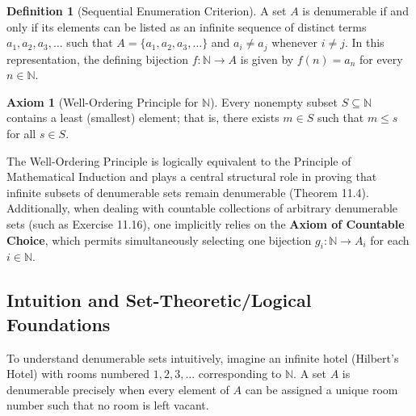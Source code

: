 \documentclass[11pt, letterpaper]{article}
\theoremstyle{definition}
\newtheorem{definition}{Definition}[section]
\newtheorem{axiom}{Axiom}[section]
\theoremstyle{remark}
\begin{document}
\begin{definition}[Sequential Enumeration Criterion]
A set $A$ is denumerable if and only if its elements can be listed as an infinite sequence of distinct terms $a_1, a_2, a_3, \dots$ such that $A = \{a_1, a_2, a_3, \dots\}$ and $a_i \neq a_j$ whenever $i \neq j$. In this representation, the defining bijection $f : \mathbb{N} \to A$ is given by $f(n) = a_n$ for every $n \in \mathbb{N}$.
\end{definition}

\begin{axiom}[Well-Ordering Principle for $\mathbb{N}$]
Every nonempty subset $S \subseteq \mathbb{N}$ contains a least (smallest) element; that is, there exists $m \in S$ such that $m \leq s$ for all $s \in S$.
\end{axiom}

The Well-Ordering Principle is logically equivalent to the Principle of Mathematical Induction and plays a central structural role in proving that infinite subsets of denumerable sets remain denumerable (Theorem 11.4). Additionally, when dealing with countable collections of arbitrary denumerable sets (such as Exercise 11.16), one implicitly relies on the \textbf{Axiom of Countable Choice}, which permits simultaneously selecting one bijection $g_i : \mathbb{N} \to A_i$ for each $i \in \mathbb{N}$.

\subsection{Intuition and Set-Theoretic/Logical Foundations}

To understand denumerable sets intuitively, imagine an infinite hotel (Hilbert's Hotel) with rooms numbered $1, 2, 3, \dots$ corresponding to $\mathbb{N}$. A set $A$ is denumerable precisely when every element of $A$ can be assigned a unique room number such that no room is left vacant.
\end{document}
